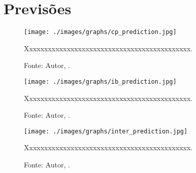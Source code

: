 \section{Previsões}





\begin{figure}[H]
    \centering
    \texttt{[image: ./images/graphs/cp\_prediction.jpg]}
    \caption{Xxxxxxxxxxxxxxxxxxxxxxxxxxxxxxxxxxxxxxxxxxxx.}
    \label{fig:cp_prediction.jpg}
    \caption*{Fonte: Autor, \imprimirdata.}
\end{figure}




\begin{figure}[H]
    \centering
    \texttt{[image: ./images/graphs/ib\_prediction.jpg]}
    \caption{Xxxxxxxxxxxxxxxxxxxxxxxxxxxxxxxxxxxxxxxxxxxx.}
    \label{fig:ib_prediction.jpg}
    \caption*{Fonte: Autor, \imprimirdata.}
\end{figure}




\begin{figure}[H]
    \centering
    \texttt{[image: ./images/graphs/inter\_prediction.jpg]}
    \caption{Xxxxxxxxxxxxxxxxxxxxxxxxxxxxxxxxxxxxxxxxxxxx.}
    \label{fig:inter_prediction.jpg}
    \caption*{Fonte: Autor, \imprimirdata.}
\end{figure}




